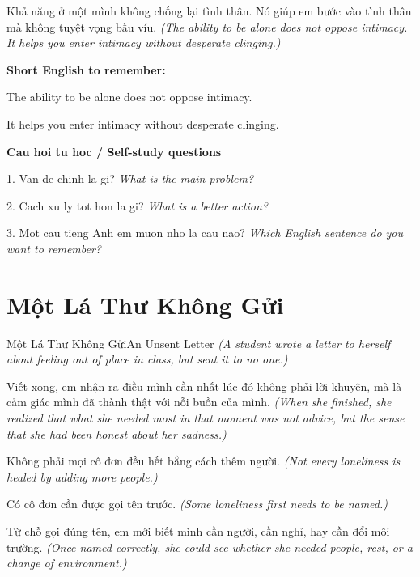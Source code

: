 \begin{baihoc}
Khả năng ở một mình không chống lại tình thân. Nó giúp em bước vào tình thân mà không tuyệt vọng bấu víu.
\textit{(The ability to be alone does not oppose intimacy. It helps you enter intimacy without desperate clinging.)}
\end{baihoc}

\begin{ghinhoanh}
\textbf{Short English to remember:}

The ability to be alone does not oppose intimacy.

It helps you enter intimacy without desperate clinging.

\end{ghinhoanh}

\begin{tuhocnhanh}
\textbf{Cau hoi tu hoc / Self-study questions}

1. Van de chinh la gi? \textit{What is the main problem?}

2. Cach xu ly tot hon la gi? \textit{What is a better action?}

3. Mot cau tieng Anh em muon nho la cau nao? \textit{Which English sentence do you want to remember?}
\end{tuhocnhanh}
\ngancach

\section{Một Lá Thư Không Gửi}
\begin{truyen}{Một Lá Thư Không Gửi}{An Unsent Letter}
\textit{(A student wrote a letter to herself about feeling out of place in class, but sent it to no one.)}

Viết xong, em nhận ra điều mình cần nhất lúc đó không phải lời khuyên, mà là cảm giác mình đã thành thật với nỗi buồn của mình.
\textit{(When she finished, she realized that what she needed most in that moment was not advice, but the sense that she had been honest about her sadness.)}

Không phải mọi cô đơn đều hết bằng cách thêm người.
\textit{(Not every loneliness is healed by adding more people.)}

Có cô đơn cần được gọi tên trước.
\textit{(Some loneliness first needs to be named.)}

Từ chỗ gọi đúng tên, em mới biết mình cần người, cần nghỉ, hay cần đổi môi trường.
\textit{(Once named correctly, she could see whether she needed people, rest, or a change of environment.)}

\end{truyen}

